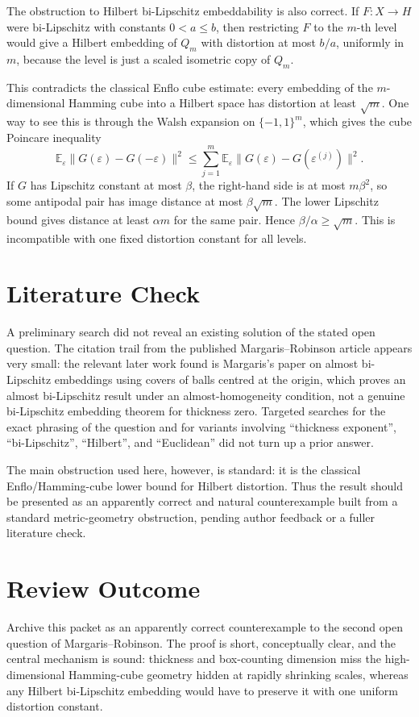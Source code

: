 ﻿\documentclass[11pt]{article}
\begin{document}
The obstruction to Hilbert bi-Lipschitz embeddability is also correct.  If
\(F:X\to H\) were bi-Lipschitz with constants \(0<a\leq b\), then restricting
\(F\) to the \(m\)-th level would give a Hilbert embedding of \(Q_m\) with
distortion at most \(b/a\), uniformly in \(m\), because the level is just a
scaled isometric copy of \(Q_m\).

This contradicts the classical Enflo cube estimate: every embedding of the
\(m\)-dimensional Hamming cube into a Hilbert space has distortion at least
\(\sqrt m\).  One way to see this is through the Walsh expansion on
\(\{-1,1\}^m\), which gives the cube Poincare inequality
\[
  \mathbb E_\varepsilon
  \|G(\varepsilon)-G(-\varepsilon)\|^2
  \leq
  \sum_{j=1}^m
  \mathbb E_\varepsilon
  \|G(\varepsilon)-G(\varepsilon^{(j)})\|^2.
\]
If \(G\) has Lipschitz constant at most \(\beta\), the right-hand side is at
most \(m\beta^2\), so some antipodal pair has image distance at most
\(\beta\sqrt m\).  The lower Lipschitz bound gives distance at least
\(\alpha m\) for the same pair.  Hence \(\beta/\alpha\geq \sqrt m\).  This is
incompatible with one fixed distortion constant for all levels.

\section*{Literature Check}

A preliminary search did not reveal an existing solution of the stated open
question.  The citation trail from the published Margaris--Robinson article
appears very small: the relevant later work found is Margaris's paper on
almost bi-Lipschitz embeddings using covers of balls centred at the origin,
which proves an almost bi-Lipschitz result under an almost-homogeneity
condition, not a genuine bi-Lipschitz embedding theorem for thickness zero.
Targeted searches for the exact phrasing of the question and for variants
involving ``thickness exponent'', ``bi-Lipschitz'', ``Hilbert'', and
``Euclidean'' did not turn up a prior answer.

The main obstruction used here, however, is standard: it is the classical
Enflo/Hamming-cube lower bound for Hilbert distortion.  Thus the result should
be presented as an apparently correct and natural counterexample built from a
standard metric-geometry obstruction, pending author feedback or a fuller
literature check.

\section*{Review Outcome}

Archive this packet as an apparently correct counterexample to the second
open question of Margaris--Robinson.  The proof is short, conceptually clear,
and the central mechanism is sound: thickness and box-counting dimension miss
the high-dimensional Hamming-cube geometry hidden at rapidly shrinking scales,
whereas any Hilbert bi-Lipschitz embedding would have to preserve it with one
uniform distortion constant.
\end{document}
